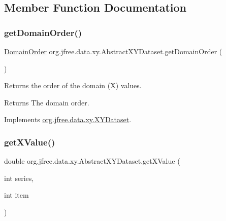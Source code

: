 \subsection{Member Function Documentation}
\mbox{\label{classorg_1_1jfree_1_1data_1_1xy_1_1_abstract_x_y_dataset_a5c1bd55a50eb79df12c9d50894f74866}} 
\subsubsection{\texorpdfstring{get\+Domain\+Order()}{getDomainOrder()}}
{\footnotesize\ttfamily \mbox{\hyperlink{classorg_1_1jfree_1_1data_1_1_domain_order}{Domain\+Order}} org.\+jfree.\+data.\+xy.\+Abstract\+X\+Y\+Dataset.\+get\+Domain\+Order (\begin{DoxyParamCaption}{ }\end{DoxyParamCaption})}

Returns the order of the domain (X) values.

\begin{DoxyReturn}{Returns}
The domain order. 
\end{DoxyReturn}


Implements \mbox{\hyperlink{interfaceorg_1_1jfree_1_1data_1_1xy_1_1_x_y_dataset_a49306db52a1ea7de951d807d21ab9c7c}{org.\+jfree.\+data.\+xy.\+X\+Y\+Dataset}}.

\mbox{\label{classorg_1_1jfree_1_1data_1_1xy_1_1_abstract_x_y_dataset_a0d74392c194073e586d8a039767c622f}} 
\subsubsection{\texorpdfstring{get\+X\+Value()}{getXValue()}}
{\footnotesize\ttfamily double org.\+jfree.\+data.\+xy.\+Abstract\+X\+Y\+Dataset.\+get\+X\+Value (\begin{DoxyParamCaption}\item[{int}]{series,  }\item[{int}]{item }\end{DoxyParamCaption})}

